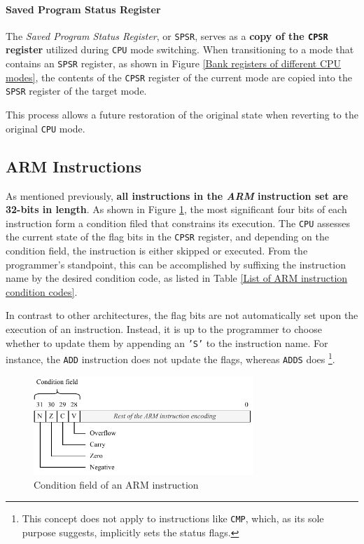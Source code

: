 \documentclass[english, ing, kiv, he, iso690numb, pdf]{fasthesis}
\begin{document}
	\paragraph{Saved Program Status Register}
	
	The \textit{Saved Program Status Register}, or \texttt{SPSR}, serves as a \textbf{copy of the \texttt{CPSR} register} utilized during \texttt{CPU} mode switching. When transitioning to a mode that contains an \texttt{SPSR} register, as shown in Figure \ref{Bank registers of different CPU modes}, the contents of the \texttt{CPSR} register of the current mode are copied into the \texttt{SPSR} register of the target mode. 
	
	This process allows a future restoration of the original state when reverting to the original \texttt{CPU} mode.
	
	\subsection{ARM Instructions}
	
	As mentioned previously, \textbf{all instructions in the \textit{ARM} instruction set are 32-bits in length}. As shown in Figure \ref{Condition field of an ARM instruction}, the most significant four bits of each instruction form a condition filed that constrains its execution. The \texttt{CPU} assesses the current state of the flag bits in the \texttt{CPSR} register, and depending on the condition field, the instruction is either skipped or executed. From the programmer's standpoint, this can be accomplished by suffixing the instruction name by the desired condition code, as listed in Table \ref{List of ARM instruction condition codes}.
	
	In contrast to other architectures, the flag bits are not automatically set upon the execution of an instruction. Instead, it is up to the programmer to choose whether to update them by appending an \texttt{'S'} to the instruction name. For instance, the \texttt{ADD} instruction does not update the flags, whereas \texttt{ADDS} does \footnote{This concept does not apply to instructions like \texttt{CMP}, which, as its sole purpose suggests, implicitly sets the status flags.}.
	
	\begin{figure}[ht]
		\centering
		\includegraphics[width=0.74\textwidth]{img/diagrams/condition_field.pdf}
		\caption{Condition field of an ARM instruction}
		\label{Condition field of an ARM instruction}
	\end{figure}
	
\end{document}
